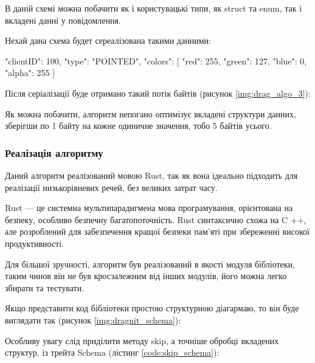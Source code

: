 \documentclass{lib/styles/default-style}
\begin{document}
    В даній схемі можна побачити як і користувацькі типи, як struct та enum, так і вкладені данні у повідомлення.
    
    Нехай дана схема будет сереалізована такими данними:

    \begin{snippet}
        {
            "clientID": 100,
            "type": "POINTED",
            "colors": [
                {
                "red": 255,
                "green": 127,
                "blue": 0,
                "alpha": 255
                }
            ]
        }\end{snippet}
    
    Після серіалізації буде отримано такий потік байтів (рисунок \ref{img:drag_algo_3}):


    Як можна побачити, алгоритм непогано оптимізує вкладені структури данних,
    зберігши по 1 байту на кожне одиничне значення, тобо 5 байтів усього.

    \subsubsection{Реалізація алгоритму}

    Даний алгоритм реалізований мовою Rust, так як вона ідеально підходить для реалізації низькорівневих речей, без великих затрат часу.

    Rust --- це системна мультипарадигмена мова програмування, орієнтована на безпеку, особливо безпечну багатопоточність. 
    Rust синтаксично схожа на C ++, але розроблений для забезпечення кращої безпеки пам’яті при збереженні високої продуктивності.

    Для більшої зручності, алгоритм був реалізований в якості модуля бібліотеки, таким чинов він не був кросзалежним від інших модулів,
    його можна легко збирати та тестувати.

    Якщо представити код бібліотеки простою структурною діагармаю, то він буде виглядати так (рисунок \ref{img:dragnit_schema}):


    Особливу увагу слід приділити методу skip, а точніше обробці вкладених структур, із трейта Schema (лістинг \ref{code:skip_schema}):
\end{document}
